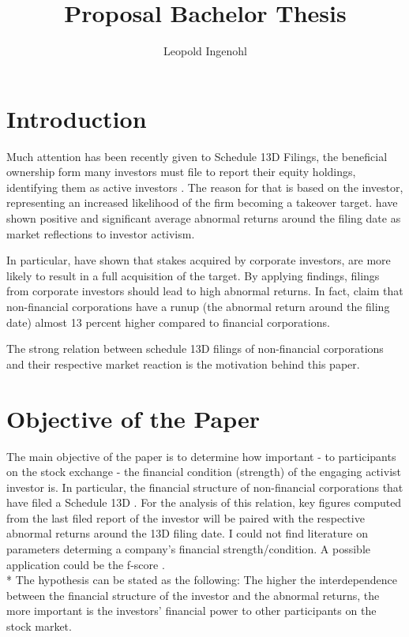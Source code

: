 \documentclass[12pt]{article}
\title{Proposal Bachelor Thesis}
\author{Leopold Ingenohl}
\begin{document}
\maketitle

\section{Introduction}
Much attention has been recently given to Schedule 13D Filings, the beneficial ownership form many investors must file to report their equity holdings, identifying them as active investors \citet{Giglia2018}. The reason for that is based on the investor, representing an increased likelihood of the firm becoming a takeover target\citep{Brigida2012}. \citet{Brav2008} have shown positive and significant average abnormal returns around the filing date as market reflections to investor activism.

In particular, \citet{Akhigbe2007} have shown that stakes acquired by corporate investors, are more likely to result in a full acquisition of the target. By applying \citep{Brav2008} findings, filings from corporate investors should lead to high abnormal returns. In fact, \citet{Brigida2012}claim that non-financial corporations have a runup (the abnormal return around the filing date) almost 13 percent higher compared to financial corporations.

The strong relation between schedule 13D filings of non-financial corporations and their respective market reaction is the motivation behind this paper.


\section{Objective of the Paper}
The main objective of the paper is to determine how important - to participants on the stock exchange - the financial condition (strength) of the engaging activist investor is. In particular, the financial structure of non-financial corporations that have filed a Schedule 13D \citep{Bell2017}. 
For the analysis of this relation, key figures computed from the last filed report of the investor will be paired with the respective abnormal returns around the 13D filing date. I could not find literature on parameters determing a company's financial strength/condition. A possible application could be the f-score \citep{Piotroski2000}.\\*
The hypothesis can be stated as the following: The higher the interdependence between the financial structure of the investor and the abnormal returns, the more important is the investors' financial power to other participants on the stock market.
\pagebreak
\end{document}
